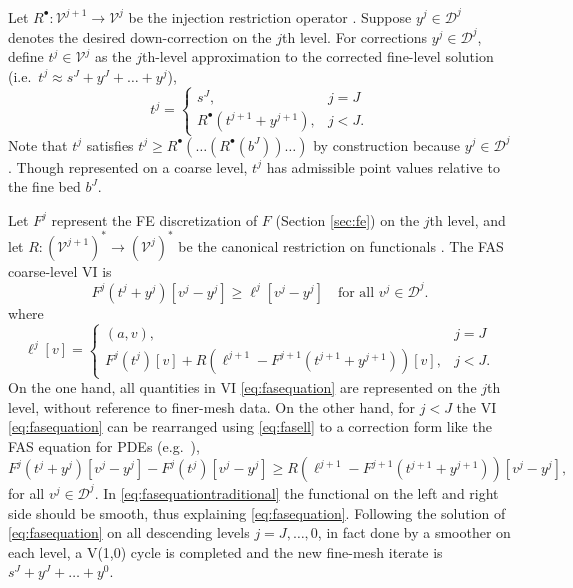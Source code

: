 \documentclass[letterpaper,final,12pt,reqno]{amsart}
\theoremstyle{claim}
\newcommand{\ip}[2]{\left(#1,#2\right)}
\newcommand{\iR}{R^{\bullet}}
\numberwithin{equation}{section}
\numberwithin{figure}{section}
\numberwithin{table}{section}
\numberwithin{theorem}{section}
\begin{document}
Let $\iR: \mathcal{V}^{j+1} \to \mathcal{V}^j$ be the injection restriction operator \cite{Trottenbergetal2001}.  Suppose $y^j \in \mathcal{D}^j$ denotes the desired down-correction on the $j$th level.  For corrections $y^j \in \mathcal{D}^j$, define $t^j \in \mathcal{V}^j$ as the $j$th-level approximation to the corrected fine-level solution (i.e.~$t^j \approx s^J + y^J + \dots + y^j$),
\begin{equation}
t^j = \begin{cases} s^J, & j=J \\
                    \iR(t^{j+1} + y^{j+1}), & j < J.
      \end{cases}  \label{eq:fassolution}
\end{equation}
Note that $t^j$ satisfies $t^j \ge \iR(\dots(\iR(b^J))\dots)$ by construction because $y^j \in \mathcal{D}^j$.  Though represented on a coarse level, $t^j$ has admissible point values relative to the fine bed $b^J$.

Let $F^j$ represent the FE discretization of $F$ (Section \ref{sec:fe}) on the $j$th level, and let $R: (\mathcal{V}^{j+1})^* \to (\mathcal{V}^j)^*$ be the canonical restriction on functionals \cite{GraeserKornhuber2009}.  The FAS coarse-level VI is
\begin{equation}
F^j(t^j+y^j)[v^j-y^j] \ge \ell^j[v^j-y^j] \quad \text{for all } v^j \in \mathcal{D}^j. \label{eq:fasequation}
\end{equation}
where
\begin{equation}
\ell^j[v] = \begin{cases} \ip{a}{v}, & j=J \\
                          F^j(t^j)[v] + R \left(\ell^{j+1} - F^{j+1}(t^{j+1}+y^{j+1})\right)[v], & j < J. \end{cases}  \label{eq:fasell}
\end{equation}
On the one hand, all quantities in VI \eqref{eq:fasequation} are represented on the $j$th level, without reference to finer-mesh data.  On the other hand, for $j<J$ the VI \eqref{eq:fasequation} can be rearranged using \eqref{eq:fasell} to a correction form like the FAS equation for PDEs (e.g.~\cite[equation (5.3.12)]{Trottenbergetal2001}),
\begin{equation}
F^j(t^j+y^j)[v^j-y^j] - F^j(t^j)[v^j-y^j] \ge R \left(\ell^{j+1} - F^{j+1}(t^{j+1}+y^{j+1})\right)[v^j-y^j], \label{eq:fasequationtraditional}
\end{equation}
for all $v^j \in \mathcal{D}^j$.  In \eqref{eq:fasequationtraditional} the functional on the left and right side should be smooth, thus explaining \eqref{eq:fasequation}.  Following the solution of \eqref{eq:fasequation} on all descending levels $j=J,\dots,0$, in fact done by a smoother on each level, a V(1,0) cycle is completed and the new fine-mesh iterate is $s^J + y^J + \dots + y^0$.
\end{document}
